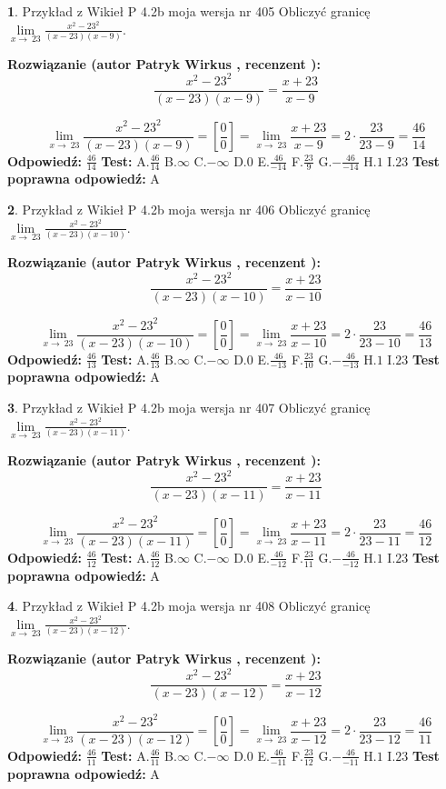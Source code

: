 \documentclass[12pt, a4paper]{article}
\theoremstyle{definition} %
\newtheorem{zad}{}
\newcommand{\zadStart}[1]{\begin{zad}#1\newline}
\newcommand{\zadStop}{\end{zad}}
\newcommand{\rozwStart}[2]{\noindent \textbf{Rozwiązanie (autor #1 , recenzent #2): }\newline}
\newcommand{\rozwStop}{\newline}
\newcommand{\odpStart}{\noindent \textbf{Odpowiedź:}\newline}
\newcommand{\odpStop}{\newline}
\newcommand{\testStart}{\noindent \textbf{Test:}\newline}
\newcommand{\testStop}{\newline}
\newcommand{\kluczStart}{\noindent \textbf{Test poprawna odpowiedź:}\newline}
\newcommand{\kluczStop}{\newline}
\begin{document}
\zadStart{Przykład z Wikieł P 4.2b moja wersja nr 405}
Obliczyć granicę $\lim\limits_{x\to\ 23}\frac{x^{2}-23^{2}}{(x-23)(x-9)}$.
\zadStop
\rozwStart{Patryk Wirkus}{}
$$\frac{x^{2}-23^{2}}{(x-23)(x-9)}=\frac{x+23}{x-9}$$

$$\lim\limits_{x\to\ 23}\frac{x^{2}-23^{2}}{(x-23)(x-9)}=[\frac{0}{0}]=\lim\limits_{x\to\ 23}\frac{x+23}{x-9}=2 \cdot \frac{23}{23-9} = \frac{46}{14}$$
\rozwStop
\odpStart
$\frac{46}{14}$
\odpStop
\testStart
A.$\frac{46}{14}$
B.$\infty$
C.$-\infty$
D.$0$
E.$\frac{46}{-14}$
F.$\frac{23}{9}$
G.$-\frac{46}{-14}$
H.$1$
I.$23$
\testStop
\kluczStart
A
\kluczStop



\zadStart{Przykład z Wikieł P 4.2b moja wersja nr 406}
Obliczyć granicę $\lim\limits_{x\to\ 23}\frac{x^{2}-23^{2}}{(x-23)(x-10)}$.
\zadStop
\rozwStart{Patryk Wirkus}{}
$$\frac{x^{2}-23^{2}}{(x-23)(x-10)}=\frac{x+23}{x-10}$$

$$\lim\limits_{x\to\ 23}\frac{x^{2}-23^{2}}{(x-23)(x-10)}=[\frac{0}{0}]=\lim\limits_{x\to\ 23}\frac{x+23}{x-10}=2 \cdot \frac{23}{23-10} = \frac{46}{13}$$
\rozwStop
\odpStart
$\frac{46}{13}$
\odpStop
\testStart
A.$\frac{46}{13}$
B.$\infty$
C.$-\infty$
D.$0$
E.$\frac{46}{-13}$
F.$\frac{23}{10}$
G.$-\frac{46}{-13}$
H.$1$
I.$23$
\testStop
\kluczStart
A
\kluczStop



\zadStart{Przykład z Wikieł P 4.2b moja wersja nr 407}
Obliczyć granicę $\lim\limits_{x\to\ 23}\frac{x^{2}-23^{2}}{(x-23)(x-11)}$.
\zadStop
\rozwStart{Patryk Wirkus}{}
$$\frac{x^{2}-23^{2}}{(x-23)(x-11)}=\frac{x+23}{x-11}$$

$$\lim\limits_{x\to\ 23}\frac{x^{2}-23^{2}}{(x-23)(x-11)}=[\frac{0}{0}]=\lim\limits_{x\to\ 23}\frac{x+23}{x-11}=2 \cdot \frac{23}{23-11} = \frac{46}{12}$$
\rozwStop
\odpStart
$\frac{46}{12}$
\odpStop
\testStart
A.$\frac{46}{12}$
B.$\infty$
C.$-\infty$
D.$0$
E.$\frac{46}{-12}$
F.$\frac{23}{11}$
G.$-\frac{46}{-12}$
H.$1$
I.$23$
\testStop
\kluczStart
A
\kluczStop



\zadStart{Przykład z Wikieł P 4.2b moja wersja nr 408}
Obliczyć granicę $\lim\limits_{x\to\ 23}\frac{x^{2}-23^{2}}{(x-23)(x-12)}$.
\zadStop
\rozwStart{Patryk Wirkus}{}
$$\frac{x^{2}-23^{2}}{(x-23)(x-12)}=\frac{x+23}{x-12}$$

$$\lim\limits_{x\to\ 23}\frac{x^{2}-23^{2}}{(x-23)(x-12)}=[\frac{0}{0}]=\lim\limits_{x\to\ 23}\frac{x+23}{x-12}=2 \cdot \frac{23}{23-12} = \frac{46}{11}$$
\rozwStop
\odpStart
$\frac{46}{11}$
\odpStop
\testStart
A.$\frac{46}{11}$
B.$\infty$
C.$-\infty$
D.$0$
E.$\frac{46}{-11}$
F.$\frac{23}{12}$
G.$-\frac{46}{-11}$
H.$1$
I.$23$
\testStop
\kluczStart
A
\kluczStop
\end{document}
